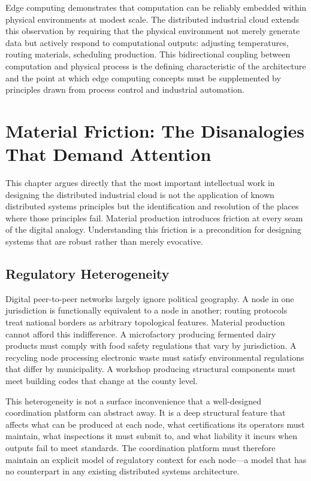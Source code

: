 \documentclass[12pt]{book}
\theoremstyle{definition}
\theoremstyle{remark}
\begin{document}
Edge computing demonstrates that computation can be reliably embedded
within physical environments at modest scale. The distributed
industrial cloud extends this observation by requiring that the
physical environment not merely generate data but actively respond to
computational outputs: adjusting temperatures, routing materials,
scheduling production. This bidirectional coupling between
computation and physical process is the defining characteristic of
the architecture and the point at which edge computing concepts must
be supplemented by principles drawn from process control and
industrial automation.

\chapter{Material Friction: The Disanalogies That Demand Attention}

This chapter argues directly that the most important intellectual
work in designing the distributed industrial cloud is not the
application of known distributed systems principles but the
identification and resolution of the places where those principles
fail. Material production introduces friction at every seam of the
digital analogy. Understanding this friction is a precondition for
designing systems that are robust rather than merely evocative.

\section{Regulatory Heterogeneity}

Digital peer-to-peer networks largely ignore political geography.
A node in one jurisdiction is functionally equivalent to a node in
another; routing protocols treat national borders as arbitrary
topological features. Material production cannot afford this
indifference. A microfactory producing fermented dairy products must
comply with food safety regulations that vary by jurisdiction.
A recycling node processing electronic waste must satisfy
environmental regulations that differ by municipality. A workshop
producing structural components must meet building codes that
change at the county level.

This heterogeneity is not a surface inconvenience that a well-designed
coordination platform can abstract away. It is a deep structural
feature that affects what can be produced at each node, what
certifications its operators must maintain, what inspections it must
submit to, and what liability it incurs when outputs fail to meet
standards. The coordination platform must therefore maintain an
explicit model of regulatory context for each node---a model that has
no counterpart in any existing distributed systems architecture.
\end{document}
